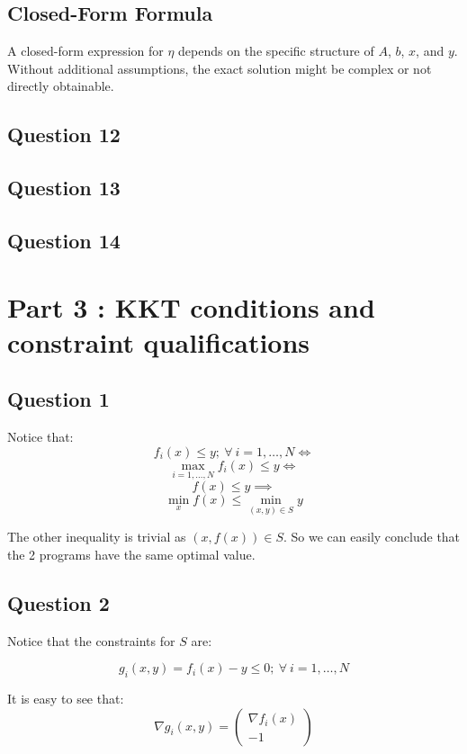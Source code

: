\documentclass[12p]{article}
\begin{document}
\subsection*{Closed-Form Formula}
A closed-form expression for \(\eta\) depends on the specific structure of \(A\), \(b\), \(x\), and \(y\). Without additional assumptions, the exact solution might be complex or not directly obtainable.


\subsection*{Question 12} 

\subsection*{Question 13} 


\subsection*{Question 14} 

\newpage

\section*{Part 3 : KKT conditions and constraint qualifications}

\subsection*{Question 1}\hfil\par
Notice that:
\[f_i(x)\leq y;\ \forall \ i=1,\dots,N\iff\]
\[\max_{i=1,\dots,N}f_i(x)\leq y\iff \]
\[f(x)\leq y \implies \]
\[\min_xf(x)\leq\min_{(x,y)\in S}y\]

The other inequality is trivial as \((x,f(x))\in S\). So we can easily conclude that the 2 programs have the same optimal value.

\subsection*{Question 2}\hfil\par
Notice that the constraints for \(S\) are:

\[
    g_i(x,y)=f_i(x)-y\leq 0;\ \forall \ i=1,\dots,N
\]

It is easy to see that:
\[
    \nabla g_i(x,y)=\begin{pmatrix}
    \nabla f_i(x)\\
     -1
    \end{pmatrix}    
\]
\end{document}
